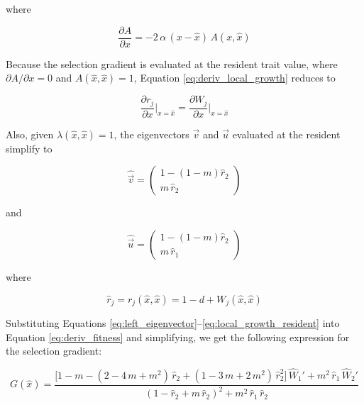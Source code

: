 where

\begin{equation}
    \frac{\partial A}{\partial x} = -2 \, \alpha \, (x - \hat{x}) \, A(x, \hat{x})
\end{equation}

Because the selection gradient is evaluated at the resident trait value, where $\partial A / \partial x = 0$ and $A(\hat{x},\hat{x}) = 1$, Equation \ref{eq:deriv_local_growth} reduces to

\begin{equation}
    \frac{\partial r_j}{\partial x}\bigg|_{x=\hat{x}} = \frac{\partial W_j}{\partial x}\bigg|_{x=\hat{x}} 
\end{equation}

Also, given $\lambda(\hat{x}, \hat{x}) = 1$, the eigenvectors $\overrightarrow{v}$ and $\overrightarrow{u}$ evaluated at the resident simplify to

\begin{equation}
    \hat{\overrightarrow{v}} = 
    \begin{pmatrix}
        1 - (1-m)\hat{r}_2\\
        m \, \hat{r}_2
    \end{pmatrix}
    \label{eq:left_eigenvector_resident}
\end{equation}

and

\begin{equation}
    \hat{\overrightarrow{u}} = 
    \begin{pmatrix}
        1 - (1-m)\hat{r}_2\\
        m \, \hat{r}_1
    \end{pmatrix}
    \label{eq:right_eigenvector_resident}
\end{equation}

where 

\begin{equation}
    \hat{r}_j = r_j(\hat{x}, \hat{x}) = 1 - d + W_j(\hat{x}, \hat{x})
    \label{eq:local_growth_resident}
\end{equation}

Substituting Equations \ref{eq:left_eigenvector}--\ref{eq:local_growth_resident} into Equation \ref{eq:deriv_fitness} and simplifying, we get the following expression for the selection gradient:

\begin{equation}
    G(\hat{x}) = \frac{\big[1-m-(2-4\,m+m^2)\,\hat{r}_2+(1-3\,m+2\,m^2)\,\hat{r}^2_2\big]\, \hat{W}_1' + m^2\,\hat{r}_1\,\hat{W}_2'}{(1-\hat{r}_2+m\,\hat{r}_2)^2 + m^2\,\hat{r}_1\,\hat{r}_2}
    \label{eq:fitness_gradient_expression}
\end{equation}

